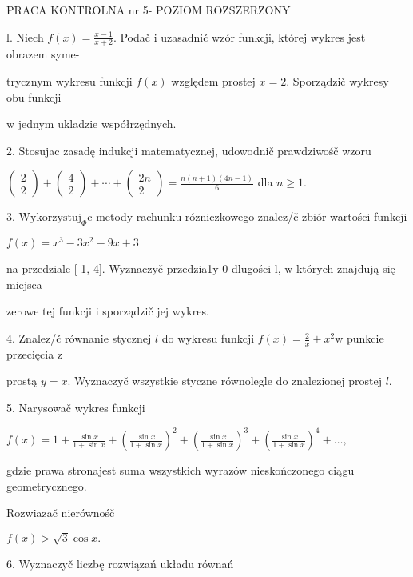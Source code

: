 \documentclass[a4paper,12pt]{article}
\begin{document}
PRACA KONTROLNA nr 5- POZIOM ROZSZERZONY

l. Niech $f(x)=\displaystyle \frac{x-1}{x+2}$. Podač $\mathrm{i}$ uzasadnič wzór funkcji, której wykres jest obrazem syme-

trycznym wykresu funkcji $f(x)$ względem prostej $x=2$. Sporządzič wykresy obu funkcji

$\mathrm{w}$ jednym ukladzie współrzędnych.

2. Stosujac zasadę indukcji matematycznej, udowodnič prawdziwośč wzoru

$\left(\begin{array}{l}
2\\
2
\end{array}\right) +\left(\begin{array}{l}
4\\
2
\end{array}\right)+\cdots+\left(\begin{array}{l}
2n\\
2
\end{array}\right) =\displaystyle \frac{n(n+1)(4n-1)}{6}$ dla $n\geq 1.$

3. $\mathrm{W}\mathrm{y}\mathrm{k}\mathrm{o}\mathrm{r}\mathrm{z}\mathrm{y}\mathrm{s}\mathrm{t}\mathrm{u}\mathrm{j}_{\Phi}\mathrm{c}$ metody rachunku rózniczkowego znalez/č zbiór wartości funkcji

$f(x)=x^{3}-3x^{2}-9x+3$

na przedziale [-1, 4]. Wyznaczyč przedzia1y $0$ dlugości l, $\mathrm{w}$ których znajdują się miejsca

zerowe tej funkcji $\mathrm{i}$ sporządzič jej wykres.

4. Znalez/č równanie stycznej $l$ do wykresu funkcji $f(x) = \displaystyle \frac{2}{x}+x^{2}\mathrm{w}$ punkcie przecięcia $\mathrm{z}$

prostą $y=x$. Wyznaczyč wszystkie styczne równolegle do znalezionej prostej $l.$

5. Narysowač wykres funkcji

$f(x)=1+\displaystyle \frac{\sin x}{1+\sin x}+(\frac{\sin x}{1+\sin x})^{2}+(\frac{\sin x}{1+\sin x})^{3}+(\frac{\sin x}{1+\sin x})^{4}+\ldots,$

gdzie prawa stronajest suma wszystkich wyrazów nieskończonego ciągu geometrycznego.

Rozwiazač nierównośč

$f(x)>\sqrt{3}\cos x.$

6. Wyznaczyč liczbę rozwiązań układu równań
\end{document}
